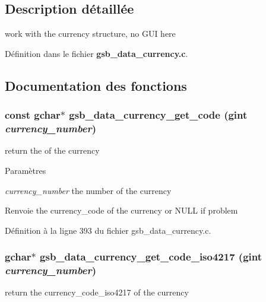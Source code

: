 \subsection{Description détaillée}
work with the currency structure, no GUI here 

Définition dans le fichier {\bf gsb\_\-data\_\-currency.c}.



\subsection{Documentation des fonctions}
\subsubsection[{gsb\_\-data\_\-currency\_\-get\_\-code}]{\setlength{\rightskip}{0pt plus 5cm}const gchar$\ast$ gsb\_\-data\_\-currency\_\-get\_\-code (gint {\em currency\_\-number})}\label{gsb__data__currency_8c_a6f9afd2f990b4e988a468c868f4371a4}
return the of the currency


\begin{DoxyParams}{Paramètres}
\item[{\em currency\_\-number}]the number of the currency\end{DoxyParams}
\begin{DoxyReturn}{Renvoie}
the currency\_\-code of the currency or NULL if problem 
\end{DoxyReturn}


Définition à la ligne 393 du fichier gsb\_\-data\_\-currency.c.

\subsubsection[{gsb\_\-data\_\-currency\_\-get\_\-code\_\-iso4217}]{\setlength{\rightskip}{0pt plus 5cm}gchar$\ast$ gsb\_\-data\_\-currency\_\-get\_\-code\_\-iso4217 (gint {\em currency\_\-number})}\label{gsb__data__currency_8c_a2ad6d2ddf40f2a9da62e9a4f9252b869}
return the currency\_\-code\_\-iso4217 of the currency



